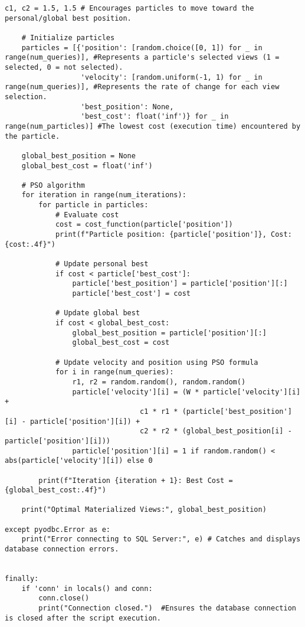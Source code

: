 \begin{lstlisting}[style=pythonstyle, caption={Python script to automate optimal view.}, label={lst:pso_query_optimization}]
    c1, c2 = 1.5, 1.5 # Encourages particles to move toward the personal/global best position.

    # Initialize particles
    particles = [{'position': [random.choice([0, 1]) for _ in range(num_queries)], #Represents a particle's selected views (1 = selected, 0 = not selected).
                  'velocity': [random.uniform(-1, 1) for _ in range(num_queries)], #Represents the rate of change for each view selection.
                  'best_position': None,
                  'best_cost': float('inf')} for _ in range(num_particles)] #The lowest cost (execution time) encountered by the particle.

    global_best_position = None  
    global_best_cost = float('inf')

    # PSO algorithm
    for iteration in range(num_iterations):
        for particle in particles:
            # Evaluate cost
            cost = cost_function(particle['position'])
            print(f"Particle position: {particle['position']}, Cost: {cost:.4f}")

            # Update personal best
            if cost < particle['best_cost']:
                particle['best_position'] = particle['position'][:]
                particle['best_cost'] = cost

            # Update global best
            if cost < global_best_cost:
                global_best_position = particle['position'][:]
                global_best_cost = cost

            # Update velocity and position using PSO formula 
            for i in range(num_queries):
                r1, r2 = random.random(), random.random()
                particle['velocity'][i] = (W * particle['velocity'][i] +
                                c1 * r1 * (particle['best_position'][i] - particle['position'][i]) +
                                c2 * r2 * (global_best_position[i] - particle['position'][i]))
                particle['position'][i] = 1 if random.random() < abs(particle['velocity'][i]) else 0

        print(f"Iteration {iteration + 1}: Best Cost = {global_best_cost:.4f}")

    print("Optimal Materialized Views:", global_best_position)

except pyodbc.Error as e:
    print("Error connecting to SQL Server:", e) # Catches and displays database connection errors.


finally:
    if 'conn' in locals() and conn:
        conn.close()
        print("Connection closed.")  #Ensures the database connection is closed after the script execution.





\end{lstlisting}